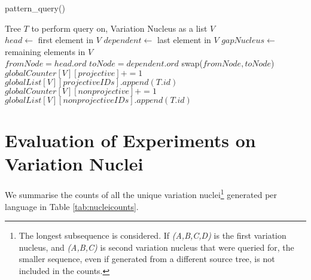 \begin{algorithm}[h]
\caption{pattern\_query()}
\label{algo:querydependent}
    \begin{algorithmic}[1]
    \REQUIRE Tree $T$ to perform query on, Variation Nucleus as a list $V$
        \STATE {}\\
        \STATE $head \leftarrow $ first element in $V$
        \STATE $dependent \leftarrow $ last element in $V$
        \STATE $gapNucleus \leftarrow $ remaining elements in $V$
            \STATE {}\\
                \STATE $fromNode = head.ord$
                \STATE $toNode = dependent.ord$
                    \STATE swap($fromNode, toNode$)
                \ENDIF
                        \RETURN
                    \ENDIF
                \ENDFOR
                \STATE {}
                    \STATE $globalCounter[V][projective] += 1$
                    \STATE $globalList[V][projectiveIDs].append(T.id)$
                \ELSE
                    \STATE $globalCounter[V][nonprojective] += 1$
                    \STATE $globalList[V][nonprojectiveIDs].append(T.id)$
                \ENDIF
            \ENDIF
        \ENDIF
    \ENDIF
\end{algorithmic}
\end{algorithm}

\section{Evaluation of Experiments on Variation Nuclei}
\label{sec:nonprojeval}

We summarise the counts of all the unique variation nuclei\footnote{The longest subsequence is considered. If \textit{(A,B,C,D)} is the first variation nucleus, and \textit{(A,B,C)} is second variation nucleus that were queried for, the smaller sequence, even if generated from a different source tree, is not included in the counts.} generated per language in Table \ref{tab:nucleicounts}. 

